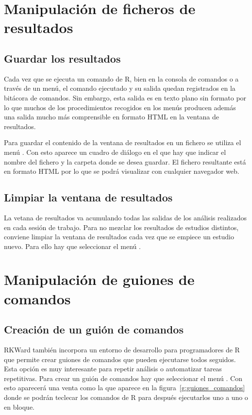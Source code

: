 \section{Manipulación de ficheros de resultados}

\subsection{Guardar los resultados}
Cada vez que se ejecuta un comando de R, bien en la consola de comandos o a través de un menú, el comando ejecutado y su
salida quedan registrados en la bitácora de comandos. Sin embargo, esta salida es en texto plano sin formato por lo que
muchos de los procedimientos recogidos en los menús producen además una salida mucho más comprensible en formato HTML en
la ventana de resultados.

Para guardar el contenido de la ventana de resultados en un fichero se utiliza el menú .
Con esto aparece un cuadro de diálogo en el que hay que indicar el nombre del fichero y la carpeta donde se desea
guardar. El fichero resultante está en formato HTML por lo que se podrá visualizar con cualquier navegador web.

\subsection{Limpiar la ventana de resultados}
La vetana de resultados va acumulando todas las salidas de los análisis realizados en cada sesión de trabajo. 
Para no mezclar los resultados de estudios distintos, conviene limpiar la ventana de resultados cada vez que se empiece un estudio nuevo.
Para ello hay que seleccionar el menú .
 

\section{Manipulación de guiones de comandos}

\subsection{Creación de un guión de comandos}
RKWard también incorpora un entorno de desarrollo para programadores de R que permite crear guiones de comandos que
pueden ejecutarse todos seguidos.
Esta opción es muy interesante para repetir análisis o automatizar tareas repetitivas.
Para crear un guión de comandos hay que seleccionar el menú .
Con esto aparecerá una venta como la que aparece en la figura~\ref{g:guiones_comandos} donde se podrán teclecar los
comandos de R para después ejecutarlos uno a uno o en bloque.

